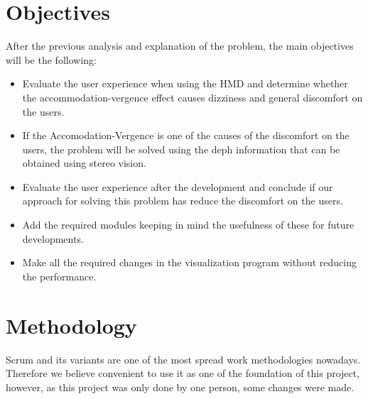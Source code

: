 \documentclass[10pt,a4paper,twocolumn,twoside]{article}
\begin{document}

	\section{Objectives}
	After the previous analysis and explanation of the problem, the main objectives will be the following: 

	\begin{itemize}
		\item Evaluate the user experience when using the HMD and determine whether the accommodation-vergence effect causes dizziness and general discomfort on the users. 
		
		\item If the Accomodation-Vergence is one of the causes of the discomfort on the users, the problem will be solved using the deph information that can be obtained using stereo vision. 
		
		\item Evaluate the user experience after the development and conclude if our approach for solving this problem has reduce the discomfort on the users. 
		
		\item Add the required modules keeping in mind the usefulness of these for future developments.
		
		\item Make all the required changes in the visualization program without reducing the performance. 
	\end{itemize}

	\section{Methodology}
	
	Scrum and its variants are one of the most spread work methodologies nowadays. Therefore we believe convenient to use it as one of the foundation of this project, however, as this project was only done by one person, some changes were made. 
	
\end{document}
